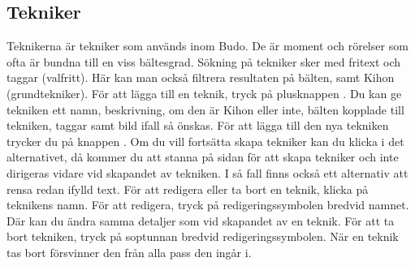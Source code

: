 \documentclass{article}
\newcommand{\button}[1]{{\tcbox{\textcolor{detail}{#1}}}}
\newcommand*{\img}[1]{%
    \raisebox{-.3\baselineskip}{%
        \texttt{[image: \#1]}%
    }%
}
\begin{document}
{    \subsection{Tekniker}
        Teknikerna är tekniker som används inom Budo. De är moment och rörelser som ofta är bundna till en viss bältesgrad.
        Sökning på tekniker sker med fritext och taggar (valfritt). Här kan man också filtrera resultaten på bälten, samt Kihon (grundtekniker).
        För att lägga till en teknik, tryck på plusknappen \img{images/icons ref/RoundButton.png}. Du kan ge tekniken ett namn, beskrivning, om den är Kihon eller inte, bälten kopplade till tekniken, taggar samt bild ifall så önskas. För att lägga till den nya tekniken trycker du på knappen \button{Lägg till}. Om du vill fortsätta skapa tekniker kan du klicka i det alternativet, då kommer du att stanna på sidan för att skapa tekniker och inte dirigeras vidare vid skapandet av tekniken. I så fall finns också ett alternativ att rensa redan ifylld text. För att redigera eller ta bort en teknik, klicka på teknikens namn. För att redigera, tryck på redigeringssymbolen \img{images/icons ref/pencil.png} bredvid namnet. Där kan du ändra samma detaljer som vid skapandet av en teknik. För att ta bort tekniken, tryck på soptunnan \img{images/icons ref/trash.png} bredvid redigeringssymbolen. När en teknik tas bort försvinner den från alla pass den ingår i.
        \begin{figure}[h]
        \centering
\end{figure}}
\end{document}
